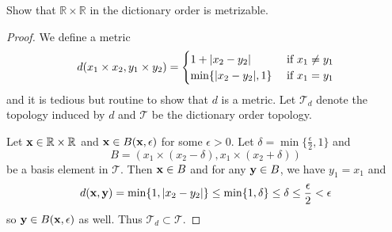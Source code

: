 \documentclass[11pt]{article}
\begin{document}



\begin{ex}{20.2}
  Show that $\mathbb{R} \times \mathbb{R}$ in the dictionary order is
  metrizable.
\end{ex}

\begin{proof}
  We define a metric
  \[ d(x_1 \times x_2, y_1 \times y_2)
    = \begin{cases}
        1 + \abs{x_2 - y_2} &\text{ if } x_1 \neq y_1 \\
        \min\{\abs{x_2 - y_2}, 1\} &\text{ if } x_1 = y_1
      \end{cases}
  \]
  and it is tedious but routine to show that $d$ is a metric. Let
  $\mathcal{T}_d$ denote the topology induced by $d$ and $\mathcal{T}$ be the
  dictionary order topology.

  Let $\vb x \in \mathbb{R} \times \mathbb{R}$ and $\vb x \in B(\vb x,
  \epsilon)$ for some $\epsilon > 0$. Let $\delta = \min\{\frac{\epsilon}{2},
  1\}$ and
  \[B = (x_1 \times (x_2 - \delta), x_1 \times (x_2 + \delta)) \]
  be a basis element in $\mathcal{T}$. Then $\vb x \in B$ and for any $\vb y \in B$,
  we have $y_1 = x_1$ and
  \[ d(\vb x, \vb y) = \min\{1, \abs{x_2 - y_2}\} \leq \min\{1, \delta\} \leq
  \delta \leq \frac{\epsilon}{2} < \epsilon \]
  so $\vb y \in B(\vb x, \epsilon)$ as well. Thus $\mathcal{T}_d \subset
  \mathcal{T}$.


\end{proof}
\end{document}
